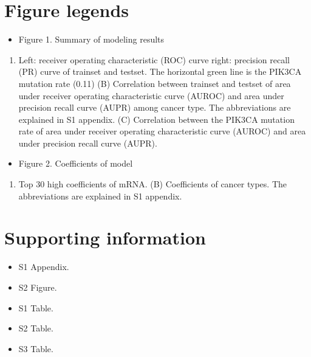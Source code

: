 \documentclass[10pt,letterpaper]{article}
\providecommand{\tightlist}{%
  \setlength{\itemsep}{0pt}\setlength{\parskip}{0pt}}
\begin{document}
\hypertarget{figure-legends}{%
\section{Figure legends}\label{figure-legends}}

\begin{itemize}
\tightlist
\item
  Figure 1. Summary of modeling results
\end{itemize}

\begin{enumerate}
\def\labelenumi{(\Alph{enumi})}
\tightlist
\item
  Left: receiver operating characteristic (ROC) curve right: precision
  recall (PR) curve of trainset and testset. The horizontal green line
  is the PIK3CA mutation rate (0.11) (B) Correlation between trainset
  and testset of area under receiver operating characteristic curve
  (AUROC) and area under precision recall curve (AUPR) among cancer
  type. The abbreviations are explained in S1 appendix. (C) Correlation
  between the PIK3CA mutation rate of area under receiver operating
  characteristic curve (AUROC) and area under precision recall curve
  (AUPR).
\end{enumerate}

\begin{itemize}
\tightlist
\item
  Figure 2. Coefficients of model
\end{itemize}

\begin{enumerate}
\def\labelenumi{(\Alph{enumi})}
\tightlist
\item
  Top 30 high coefficients of mRNA. (B) Coefficients of cancer types.
  The abbreviations are explained in S1 appendix.
\end{enumerate}

\hypertarget{supporting-information}{%
\section{Supporting information}\label{supporting-information}}

\begin{itemize}
\tightlist
\item
  S1 Appendix.\\
\item
  S2 Figure.\\
\item
  S1 Table.\\
\item
  S2 Table.\\
\item
  S3 Table.
\end{itemize}
\end{document}
